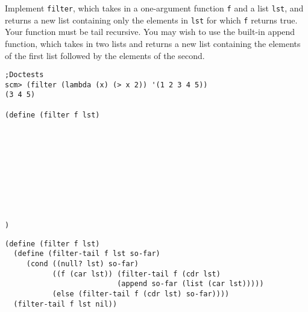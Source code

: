 \begin{blocksection}

\question Implement \texttt{filter}, which takes in a one-argument function \texttt{f} and 
a list \texttt{lst}, and returns a new list containing only the elements in \texttt{lst} 
for which \texttt{f} returns true. Your function must be tail recursive.
\newline
You may wish to use the built-in append function, which takes in two lists and returns a 
new list containing the elements of the first list followed by the elements of the second.

\begin{lstlisting}
;Doctests
scm> (filter (lambda (x) (> x 2)) '(1 2 3 4 5))
(3 4 5)

(define (filter f lst)










)
\end{lstlisting}

\begin{solution}[0.5in]
\begin{lstlisting}
(define (filter f lst)
  (define (filter-tail f lst so-far)
     (cond ((null? lst) so-far)
           ((f (car lst)) (filter-tail f (cdr lst) 
                          (append so-far (list (car lst)))))
           (else (filter-tail f (cdr lst) so-far))))
  (filter-tail f lst nil))
\end{lstlisting}
\end{solution}

\end{blocksection}